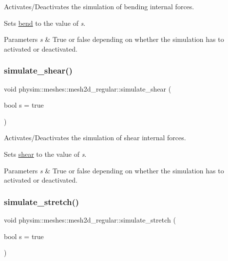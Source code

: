Activates/\+Deactivates the simulation of bending internal forces. 

Sets \hyperlink{classphysim_1_1meshes_1_1mesh2d__regular_ab031a8ece45555e421c031b7c3fff4bd}{bend} to the value of {\itshape s}. 
\begin{DoxyParams}{Parameters}
{\em s} & True or false depending on whether the simulation has to activated or deactivated. \\
\hline
\end{DoxyParams}
\mbox{\label{classphysim_1_1meshes_1_1mesh2d__regular_a36293f6559978144527fb829efd63ea2}} 
\subsubsection{\texorpdfstring{simulate\+\_\+shear()}{simulate\_shear()}}
{\footnotesize\ttfamily void physim\+::meshes\+::mesh2d\+\_\+regular\+::simulate\+\_\+shear (\begin{DoxyParamCaption}\item[{bool}]{s = {\ttfamily true} }\end{DoxyParamCaption})}



Activates/\+Deactivates the simulation of shear internal forces. 

Sets \hyperlink{classphysim_1_1meshes_1_1mesh2d__regular_af25bf35485aa0a40e21a10f4e472721a}{shear} to the value of {\itshape s}. 
\begin{DoxyParams}{Parameters}
{\em s} & True or false depending on whether the simulation has to activated or deactivated. \\
\hline
\end{DoxyParams}
\mbox{\label{classphysim_1_1meshes_1_1mesh2d__regular_a6d9ccf2226fb57cc3ffc04fd9612acdd}} 
\subsubsection{\texorpdfstring{simulate\+\_\+stretch()}{simulate\_stretch()}}
{\footnotesize\ttfamily void physim\+::meshes\+::mesh2d\+\_\+regular\+::simulate\+\_\+stretch (\begin{DoxyParamCaption}\item[{bool}]{s = {\ttfamily true} }\end{DoxyParamCaption})}



